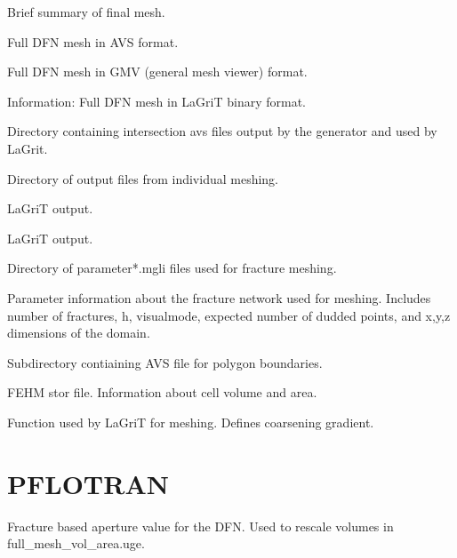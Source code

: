 \documentclass[letterpaper,10pt,english]{sphinxmanual}
\begin{document}
\label{\detokenize{output:finalmesh-txt}}
Brief summary of final mesh.

\label{\detokenize{output:full-mesh-inp}}
Full DFN mesh in AVS format.

\label{\detokenize{output:full-mesh-gmv}}
Full DFN mesh in GMV (general mesh viewer) format.

\label{\detokenize{output:full-mesh-lg}}
Information: Full DFN mesh in LaGriT binary format.

\label{\detokenize{output:intersections}}
Directory containing intersection avs files output by the generator and used by LaGrit.

\label{\detokenize{output:lagrit-logs}}
Directory of output files from individual meshing.

\label{\detokenize{output:logx3dgen}}
LaGriT output.

\label{\detokenize{output:outx3dgen}}
LaGriT output.

\label{\detokenize{output:parameters}}
Directory of parameter*.mgli files used for fracture meshing.

\label{\detokenize{output:params-txt}}
Parameter information about the fracture network used for meshing. Includes number of fractures, h, visualmode, expected number of dudded points, and x,y,z dimensions of the domain.

\label{\detokenize{output:polys}}
Subdirectory contiaining AVS file for polygon boundaries.

\label{\detokenize{output:tri-fracture-stor}}
FEHM stor file. Information about cell volume and area.

\label{\detokenize{output:user-function-lgi}}
Function used by LaGriT for meshing. Defines coarsening gradient.


\section{PFLOTRAN}
\label{\detokenize{output:id3}}
\label{\detokenize{output:aperture-dat}}
Fracture based aperture value for the DFN. Used to rescale volumes in full\_mesh\_vol\_area.uge.
\end{document}
